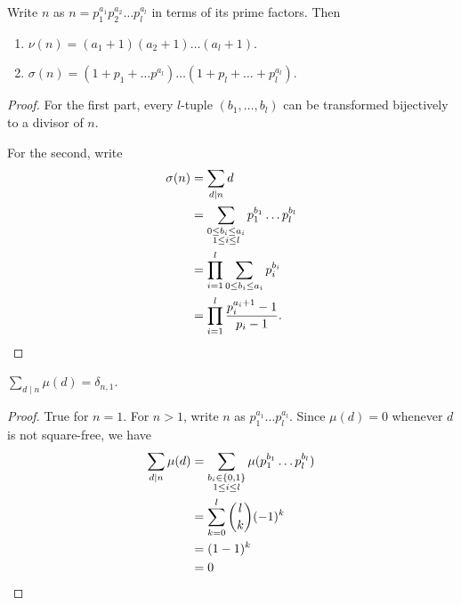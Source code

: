 \begin{proposition}
    Write $n$ as $n = p_1^{a_1} p_2^{a_2} \dots p_l^{a_l}$ in terms of its
    prime factors.
    Then
    \begin{enumerate}
        \item $\nu(n) = (a_1 + 1)(a_2 + 1) \dots (a_l + 1)$.
        \item $\sigma(n) = (1 + p_1 + \dots p^{a_l}) \dots (1 + p_l + \dots
        + p_l^{a_l})$.
    \end{enumerate}
\end{proposition}
\begin{proof}
    For the first part, every $l$-tuple $(b_1, \dots, b_l)$ can be
    transformed bijectively to a divisor of $n$.

    For the second, write \begin{align*}
        \sigma(n) &= \sum_{d \mid n} d \\
             &= \sum_{\substack{0 \le b_i \le a_i \\ 1 \le i \le l}}
                p_1^{b_1} \dots p_l^{b_l} \\
             &= \prod_{i = 1}^l \sum_{0 \le b_i \le a_i} p_i^{b_i} \\
             &= \prod_{i = 1}^l \frac{p_i^{a_i + 1} - 1}{p_i - 1}. \qedhere
    \end{align*}
\end{proof}

\begin{proposition} \label{thm:mobius_sum}
    $\sum_{d \mid n} \mu(d) = \delta_{n,1}$.
\end{proposition}
\begin{proof}
    True for $n = 1$.
    For $n > 1$, write $n$ as $p_1^{a_1} \dots p_l^{a_l}$.
    Since $\mu(d) = 0$ whenever $d$ is not square-free, we have
    \begin{align*}
        \sum_{d \mid n} \mu(d)
        &= \sum_{\substack{b_i \in \set{0, 1} \\ 1 \le i \le l}}
            \mu(p_1^{b_1} \dots p_l^{b_l}) \\
        &= \sum_{k = 0}^{l} \binom{l}{k} (-1)^k \\
        &= (1 - 1)^k \\
        &= 0 \qedhere
    \end{align*}
\end{proof}

